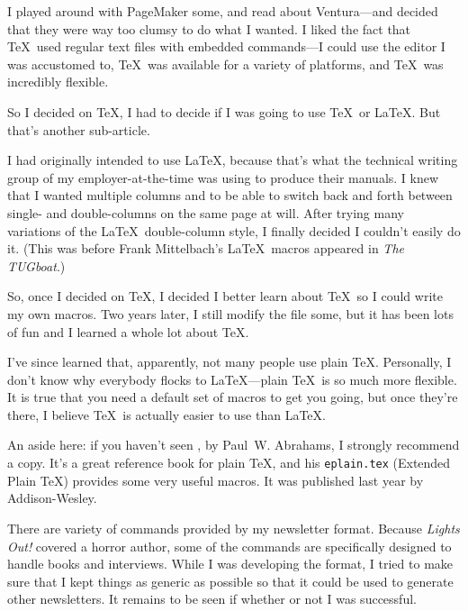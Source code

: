 I played around with PageMaker some, and read about Ventura---and decided that
they were way too clumsy to do what I wanted.  I liked the fact that \TeX\ used
regular text files with embedded commands---I could use the editor I was
accustomed to, \TeX\ was available for a variety of platforms, and \TeX\ was
incredibly flexible.

So I decided on \TeX, I had to decide if I was going to use \TeX\ or \LaTeX.
But that's another sub-article.

\articlesep                                             %

I had originally intended to use \LaTeX, because that's what the technical
writing group of my employer-at-the-time was using to produce their manuals.
I knew that I wanted multiple columns and to be able to switch back and forth
between single- and double-columns on the same page at will.  After trying
many variations of the \LaTeX\ double-column style, I finally decided I
couldn't easily do it.  (This was before Frank Mittelbach's \LaTeX\ macros
appeared in {\it The TUGboat\/}.)

So, once I decided on \TeX, I decided I better learn about \TeX\ so I could
write my own macros.  Two years later, I still modify the file some, but it
has been lots of fun and I learned a whole lot about \TeX.

I've since learned that, apparently, not many people use plain \TeX.
Personally, I don't know why everybody flocks to \LaTeX---plain \TeX\ is
so much more flexible.  It is true that you need a default set of macros
to get you going, but once they're there, I believe \TeX\ is actually
easier to use than \LaTeX.

An aside here: if you haven't seen , by Paul~W.
Abrahams, I strongly recommend a copy.  It's a great reference book for
plain \TeX, and his {\tt eplain.tex} (Extended Plain \TeX) provides some
very useful macros.  It was published last year by Addison-Wesley.

\articlesep

There are variety of commands provided by my newsletter format.  Because
{\it Lights Out!\/} covered a horror author, some of the commands are
specifically designed to handle books and interviews.  While I was developing
the format, I tried to make sure that I kept things as generic as possible
so that it could be used to generate other newsletters.  It remains to be
seen if whether or not I was successful.

